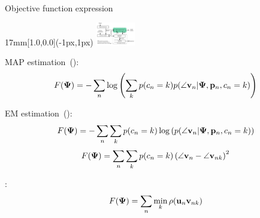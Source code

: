 \begin{frame}{Objective function expression}
  \begin{textblock*}{17mm}[1.0,0.0](\paperwidth-1px,1px)
    \includegraphics[width=17mm]{blocos_s3.png}
  \end{textblock*}

  MAP estimation~(\cite{Coughlan2003}):
  \[
  F({\boldsymbol{\Psi}}) =
  -\sum_n\log\left(
    \sum_k  p(c_n=k)p(\angle{\mathbf{v}}_n|{\boldsymbol{\Psi}},{\mathbf{p}}_n,c_n=k)
  \right)
  \]
  
  EM estimation~(\cite{Schindler2004}):
  \[F({\boldsymbol{\Psi}}) = -\sum_n \sum_k p(c_n=k) \log\left(
    p(\angle{\mathbf{v}}_n|{\boldsymbol{\Psi}},{\mathbf{p}}_n,c_n=k)
  \right)\]
  \[F({\boldsymbol{\Psi}}) = \sum_n \sum_k p(c_n=k) \left(\angle{\mathbf{v}}_n-\angle{\mathbf{v}}_{nk}\right)^2\]

  \corisco:
  \[
  F({\boldsymbol{\Psi}}) = \sum_n \min_k \rho({\mathbf{u}}_n {\mathbf{v}}_{nk})
  \]


\end{frame}
